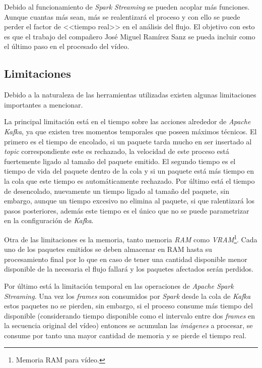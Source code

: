 Debido al funcionamiento de \textit{Spark Streaming} se pueden acoplar más funciones. Aunque cuantas más sean, más se realentizará el proceso y con ello se puede perder el factor de <<tiempo real>> en el análisis del flujo. El objetivo con esto es que el trabajo del compañero José Miguel Ramírez Sanz se pueda incluir como el último paso en el procesado del vídeo.

\subsection{Limitaciones}

Debido a la naturaleza de las herramientas utilizadas existen algunas limitaciones importantes a mencionar.

La principal limitación está en el tiempo sobre las acciones alrededor de \textit{Apache Kafka}, ya que existen tres momentos temporales que poseen máximos técnicos. El primero es el tiempo de encolado, si un paquete tarda mucho en ser insertado al \textit{topic} correspondiente este es rechazado, la velocidad de este proceso está fuertemente ligado al tamaño del paquete emitido. El segundo tiempo es el tiempo de vida del paquete dentro de la cola y si un paquete está más tiempo en la cola que este tiempo es automáticamente rechazado. Por último está el tiempo de desencolado, nuevamente un tiempo ligado al tamaño del paquete, sin embargo, aunque un tiempo excesivo no elimina al paquete, si que ralentizará los pasos posteriores, además este tiempo es el único que no se puede parametrizar en la configuración de \textit{Kafka}.

Otra de las limitaciones es la memoria, tanto memoria \textit{RAM} como \textit{VRAM}\footnote{Memoria RAM para vídeo.}. Cada uno de los paquetes emitidos se deben almacenar en RAM hasta su procesamiento final por lo que en caso de tener una cantidad disponible menor disponible de la necesaria el flujo fallará y los paquetes afectados serán perdidos.

Por último está la limitación temporal en las operaciones de \textit{Apache Spark Streaming}. Una vez los \textit{frames} son consumidos por \textit{Spark} desde la cola de \textit{Kafka} estos paquetes no se pierden, sin embargo, si el proceso consume más tiempo del disponible (considerando tiempo disponible como el intervalo entre dos \textit{frames} en la secuencia original del vídeo) entonces se acumulan las \textit{imágenes} a procesar, se consume por tanto una mayor cantidad de memoria y se pierde el tiempo real.

